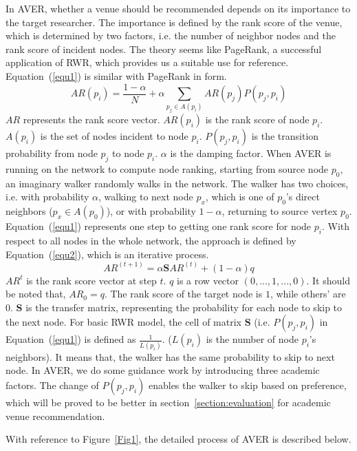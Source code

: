 \documentclass[9pt]{acm_proc_article-sp}
\begin{document}
In AVER, whether a venue should be recommended depends on its importance to the target researcher. The importance is defined by the rank score of the venue, which is determined by two factors, i.e. the number of neighbor nodes and the rank score of incident nodes. The theory seems like PageRank, a successful application of RWR, which provides us a suitable use for reference. Equation~(\ref{equ1}) is similar with PageRank in form.
\begin{equation}
\label{equ1}
AR(p_{i})=\frac{1-\alpha}{N}+\alpha \sum_{p_{j}\in A(p_{i})}AR(p_{j})P(p_{j},p_{i})
\end{equation}
$AR$ represents the rank score vector. $AR(p_{i})$ is the rank score of node $p_{i}$. $A(p_{i})$ is the set of nodes incident to node $p_{i}$. $P(p_{j},p_{i})$ is the transition probability from node $p_{j}$ to node $p_{i}$. $\alpha$ is the damping factor. When AVER is running on the network to compute node ranking, starting from source node $p_{0}$, an imaginary walker randomly walks in the network. The walker has two choices, i.e. with probability $\alpha$, walking to next node $p_{x}$, which is one of $p_{0}$'s direct neighbors ($p_{x}\in A(p_{0})$), or with probability $1-\alpha$, returning to source vertex $p_{0}$. Equation~(\ref{equ1}) represents one step to getting one rank score for node $p_{i}$. With respect to all nodes in the whole network, the approach is defined by Equation~(\ref{equ2}), which is an iterative process.
\begin{equation}
\label{equ2}
AR^{(t+1)}=\alpha \mathbf{S}AR^{(t)}+(1-\alpha)q
\end{equation}
$AR^{t}$ is the rank score vector at step $t$. $q$ is a row vector $(0,...,1,...,0)$. It should be noted that, $AR_{0}=q$. The rank score of the target node is $1$, while others' are $0$. $\mathbf{S}$ is the transfer matrix, representing the probability for each node to skip to the next node. For basic RWR model, the cell of matrix $\mathbf{S}$ (i.e. $P(p_{j},p_{i})$ in Equation~(\ref{equ1}) is defined as $\frac{1}{L(p_{i})}$. ($L(p_{i})$ is the number of node $p_{i}$'s neighbors). It means that, the walker has the same probability to skip to next node. In AVER, we do some guidance work by introducing three academic factors. The change of $P(p_{j},p_{i})$ enables the walker to skip based on preference, which will be proved to be better in section~\ref{section:evaluation} for academic venue recommendation.

With reference to Figure~\ref{Fig1}, the detailed process of AVER is described below.
\end{document}
